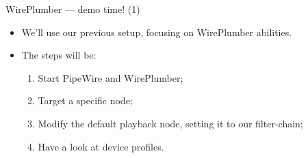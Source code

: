 \begin{frame}{WirePlumber — demo time! (1)}
  \begin{itemize}

  \item We'll use our previous setup, focusing on WirePlumber abilities.

  \item The steps will be:

    \begin{enumerate}
    \item Start PipeWire and WirePlumber;
    \item Target a specific node;
    \item Modify the default playback node, setting it to our filter-chain;
    \item Have a look at device profiles.
    \end{enumerate}

  \end{itemize}
\end{frame}



